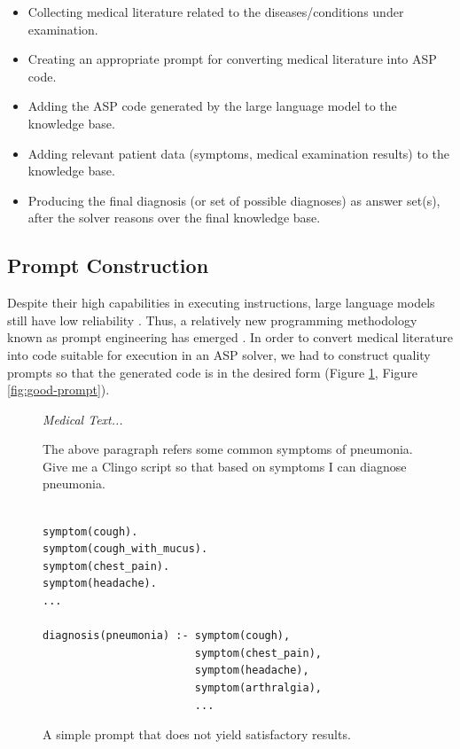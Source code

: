 \documentclass[10pt,leqno]{amsart}
\newenvironment{commandline}{
	\medskip
	\begin{mdframed}[style=commandline]
}{
	\end{mdframed}
	\medskip
}
\newenvironment{prompt}[1][Prompt:]{ %
	\medskip
	\begin{mdframed}[style=warning]
		\noindent{\textbf{#1}}
}{
	\end{mdframed}
}
\begin{document}
\begin{itemize}
	\item Collecting medical literature related to the diseases/conditions under examination.
	\item Creating an appropriate prompt for converting medical literature into ASP code.
	\item Adding the ASP code generated by the large language model to the knowledge base.
	\item Adding relevant patient data (symptoms, medical examination results) to the knowledge base.
	\item Producing the final diagnosis (or set of possible diagnoses) as answer set(s), after the solver reasons over the final knowledge base.
\end{itemize}

\subsection{Prompt Construction}

Despite their high capabilities in executing instructions, large language
models still have low reliability \cite{bowman2023things}. Thus, a relatively
new programming methodology known as prompt engineering has emerged
\cite{liu2021pretrain, promptingguidePromptEngineering}. In order to convert
medical literature into code suitable for execution in an ASP solver, we had to
construct quality prompts so that the generated code is in the desired form
(Figure \ref{fig:bad-prompt}, Figure \ref{fig:good-prompt}).

\begin{figure}[!h]
\centering
\begin{prompt}
\textit{Medical Text...}

The above paragraph refers some common symptoms of pneumonia.
Give me a Clingo script so that based on symptoms I can diagnose pneumonia.
\end{prompt}


\begin{commandline}
\begin{verbatim}

symptom(cough).
symptom(cough_with_mucus).
symptom(chest_pain).
symptom(headache).
...

diagnosis(pneumonia) :- symptom(cough), 
                        symptom(chest_pain), 
                        symptom(headache), 
                        symptom(arthralgia),
                        ...
\end{verbatim}
\end{commandline}

\caption{A simple prompt that does not yield satisfactory results.}
\label{fig:bad-prompt}
\end{figure}
\end{document}

